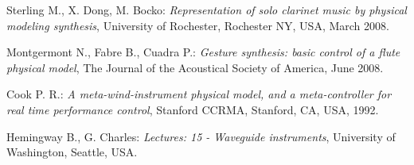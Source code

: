 \documentclass[nostrict]{szablonPG}
\begin{document}
\begin{thebibliography}{20}
		Sterling M., X. Dong, M. Bocko: \emph{Representation of solo clarinet music by physical modeling synthesis}, University of Rochester, Rochester NY, USA, March 2008.
		
		Montgermont N., Fabre B., Cuadra P.: \emph{Gesture synthesis: basic control of a flute physical model}, The Journal of the Acoustical Society of America, June 2008.
		
		Cook P. R.: \emph{A meta-wind-instrument physical model, and a meta-controller for real time performance control}, Stanford CCRMA, Stanford, CA, USA, 1992.
		
		Hemingway B., G. Charles: \emph{Lectures: 15 - Waveguide instruments}, University of Washington, Seattle, USA.
	\end{thebibliography}
	
\end{document}
